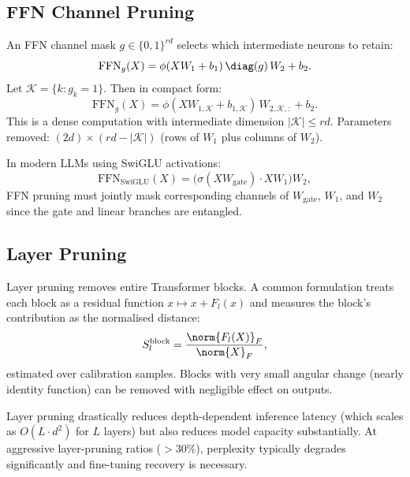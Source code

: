 \subsection{FFN Channel Pruning}

An FFN channel mask $g \in \{0,1\}^{rd}$ selects which intermediate neurons
to retain:
\begin{equation}
	\mathrm{FFN}_g(X) = \phi(XW_1 + b_1)\,\diag(g)\,W_2 + b_2.
	\label{eq:ffn_masked}
\end{equation}
Let $\mathcal{K} = \{k : g_k = 1\}$.  Then in compact form:
\begin{equation}
	\mathrm{FFN}_g(X) = \phi(X W_{1,\mathcal{K}} + b_{1,\mathcal{K}})\,W_{2,\mathcal{K},:} + b_2.
	\label{eq:ffn_compact}
\end{equation}
This is a dense computation with intermediate dimension $|\mathcal{K}| \le rd$.
Parameters removed: $(2d) \times (rd - |\mathcal{K}|)$ (rows of $W_1$ plus
columns of $W_2$).

In modern LLMs using SwiGLU activations:
\begin{equation}
	\mathrm{FFN}_{\mathrm{SwiGLU}}(X) = \bigl(\sigma(XW_{\mathrm{gate}}) \cdot XW_1\bigr)W_2,
	\label{eq:swiglu}
\end{equation}
FFN pruning must jointly mask corresponding channels of $W_{\mathrm{gate}}$,
$W_1$, and $W_2$ since the gate and linear branches are entangled.

\subsection{Layer Pruning}

Layer pruning removes entire Transformer blocks. A common formulation
treats each block as a residual function $x \mapsto x + F_l(x)$ and measures
the block's contribution as the normalised distance:
\begin{equation}
	S_l^{\mathrm{block}} = \frac{\norm{F_l(X)}_F}{\norm{X}_F},
	\label{eq:block_sensitivity}
\end{equation}
estimated over calibration samples.  Blocks with very small angular change
(nearly identity function) can be removed with negligible effect on outputs.

Layer pruning drastically reduces depth-dependent inference latency (which
scales as $O(L \cdot d^2)$ for $L$ layers) but also reduces model capacity
substantially.  At aggressive layer-pruning ratios ($> 30\%$), perplexity
typically degrades significantly and fine-tuning recovery is necessary.

